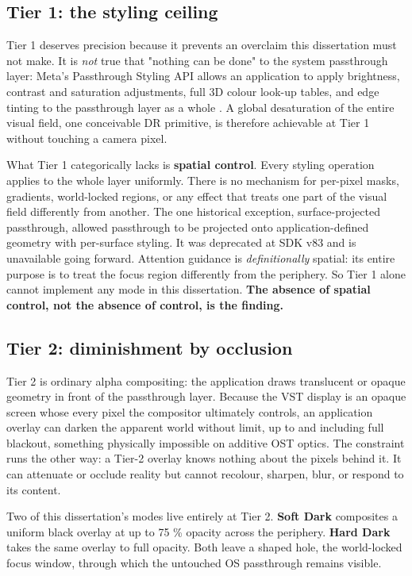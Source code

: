 \subsection{Tier 1: the styling ceiling}

Tier 1 deserves precision because it prevents an overclaim this dissertation must not make. It is
\textit{not} true that "nothing can be done" to the system passthrough layer: Meta's Passthrough Styling API
allows an application to apply brightness, contrast and saturation adjustments, full 3D colour
look-up tables, and edge tinting to the passthrough layer as a whole \citep{meta2024a}. A global
desaturation of the entire visual field, one conceivable DR primitive, is therefore achievable at
Tier 1 without touching a camera pixel.

What Tier 1 categorically lacks is \textbf{spatial control}. Every styling operation applies to the whole
layer uniformly. There is no mechanism for per-pixel masks, gradients, world-locked regions, or any
effect that treats one part of the visual field differently from another. The one historical
exception, surface-projected passthrough, allowed passthrough to be projected onto
application-defined geometry with per-surface styling. It was deprecated at SDK v83 and is unavailable
going forward. Attention guidance is \textit{definitionally} spatial: its entire purpose is to treat
the focus region differently from the periphery. So Tier 1 alone cannot implement any mode in this
dissertation. \textbf{The absence of spatial control, not the absence of control, is the finding.}

\subsection{Tier 2: diminishment by occlusion}

Tier 2 is ordinary alpha compositing: the application draws translucent or opaque geometry in front
of the passthrough layer. Because the VST display is an opaque screen whose every pixel the
compositor ultimately controls, an application overlay can darken the apparent world without limit,
up to and including full blackout, something physically impossible on additive OST optics. The
constraint runs the other way: a Tier-2 overlay knows nothing about the pixels behind it. It can
attenuate or occlude reality but cannot recolour, sharpen, blur, or respond to its content.

Two of this dissertation's modes live entirely at Tier 2. \textbf{Soft Dark} composites a uniform black
overlay at up to 75 \% opacity across the periphery. \textbf{Hard Dark} takes the same overlay to full
opacity. Both leave a shaped hole, the world-locked focus window, through which the untouched OS
passthrough remains visible.

